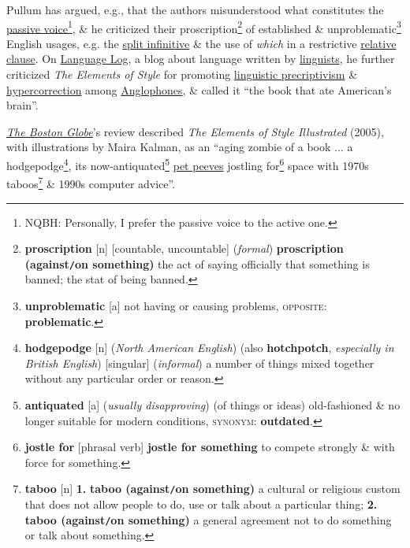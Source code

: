 \documentclass[oneside]{book}
\numberwithin{equation}{section}
\begin{document}
Pullum has argued, e.g., that the authors misunderstood what constitutes the \href{https://en.wikipedia.org/wiki/English_passive_voice}{passive voice}\footnote{NQBH: Personally, I prefer the passive voice to the active one.}, \& he criticized their proscription\footnote{\textbf{proscription} [n] [countable, uncountable] (\textit{formal}) \textbf{proscription (against\texttt{/}on something)} the act of saying officially that something is banned; the stat of being banned.} of established \& unproblematic\footnote{\textbf{unproblematic} [a] not having or causing problems, \textsc{opposite}: \textbf{problematic}.} English usages, e.g. the \href{https://en.wikipedia.org/wiki/Split_infinitive}{split infinitive} \& the use of \textit{which} in a restrictive \href{https://en.wikipedia.org/wiki/English_relative_clause#That_or_which}{relative clause}. On \href{https://en.wikipedia.org/wiki/Language_Log}{Language Log}, a blog about language written by \href{https://en.wikipedia.org/wiki/Linguists}{linguists}, he further criticized \textit{The Elements of Style} for promoting \href{https://en.wikipedia.org/wiki/Linguistic_prescriptivism}{linguistic precriptivism} \& \href{https://en.wikipedia.org/wiki/Hypercorrection}{hypercorrection} among \href{https://en.wikipedia.org/wiki/Anglophones}{Anglophones}, \& called it ``the book that ate American's brain''.

\href{https://en.wikipedia.org/wiki/The_Boston_Globe}{\textit{The Boston Globe}}'s review described \textit{The Elements of Style Illustrated} (2005), with illustrations by Maira Kalman, as an ``aging zombie of a book $\ldots$ a hodgepodge\footnote{\textbf{hodgepodge} [n] (\textit{North American English}) (also \textbf{hotchpotch}, \textit{especially in British English}) [singular] (\textit{informal}) a number of things mixed together without any particular order or reason.}, its now-antiquated\footnote{\textbf{antiquated} [a] (\textit{usually disapproving}) (of things or ideas) old-fashioned \& no longer suitable for modern conditions, \textsc{synonym}: \textbf{outdated}.} \href{https://en.wikipedia.org/wiki/Pet_peeve}{pet peeves} jostling for\footnote{\textbf{jostle for} [phrasal verb] \textbf{jostle for something} to compete strongly \& with force for something.} space with 1970s taboos\footnote{\textbf{taboo} [n] \textbf{1.} \textbf{taboo (against\texttt{/}on something)} a cultural or religious custom that does not allow people to do, use or talk about a particular thing; \textbf{2.} \textbf{taboo (against\texttt{/}on something)} a general agreement not to do something or talk about something.} \& 1990s computer advice''.
\end{document}
